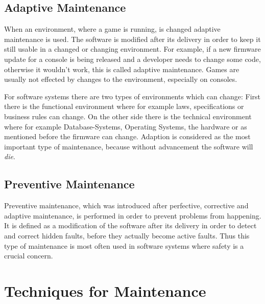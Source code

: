 \subsection{Adaptive Maintenance}
\label{subsec:adaptiveMaintenance}
When an environment, where a game is running, is changed adaptive maintenance is used.\citep{jarman_testing_2010} The software is modified after its delivery in order to keep it still usable in a changed or changing environment.\citep{pigoski_software_2015} For example, if a new firmware update for a console is being released and a developer needs to change some code, otherwise it wouldn't work, this is called adaptive maintenance. Games are usually not effected by changes to the environment, especially on consoles.\citep{jarman_testing_2010}

For software systems there are two types of environments which can change: First there is the functional environment where for example laws, specifications or business rules can change. On the other side there is the technical environment where for example Database-Systems, Operating Systems, the hardware or as mentioned before the firmware can change. Adaption is considered as the most important type of maintenance, because without advancement the software will \textit{die}.\citep{sneed_software_2005}

\subsection{Preventive Maintenance}
\label{subsec:preventiveMaintenance}
Preventive maintenance, which was introduced after perfective, corrective and adaptive maintenance, is performed in order to prevent problems from happening. It is defined as a modification of the software after its delivery in order to detect and correct hidden faults, before they actually become active faults. Thus this type of maintenance is most often used in software systems where safety is a crucial concern.\citep{pigoski_software_2015}


\section{Techniques for Maintenance}
\label{subsec:techniques}

